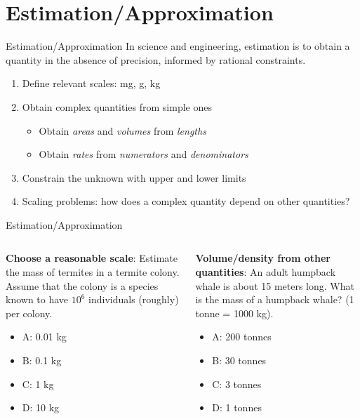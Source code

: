 \documentclass{beamer}
\begin{document}
\section{Estimation/Approximation}

\begin{frame}{Estimation/Approximation}
In science and engineering, \alert{estimation} is to obtain a quantity in the absence of precision, informed by rational constraints.
\begin{enumerate}
\item Define relevant \alert{scales}: mg, g, kg
\item Obtain \alert{complex quantities} from simple ones
\begin{itemize}
\item Obtain \textit{areas} and \textit{volumes} from \textit{lengths}
\item Obtain \textit{rates} from \textit{numerators} and \textit{denominators}
\end{itemize}
\item Constrain the unknown with \alert{upper} and \alert{lower} limits
\item Scaling problems: how does a complex quantity depend on other quantities?
\end{enumerate}
\end{frame}

\begin{frame}{Estimation/Approximation}
\small
\begin{columns}[T]
\begin{column}{0.5\textwidth}
\textbf{Choose a reasonable scale}: Estimate the mass of termites in a termite colony.  Assume that the colony is a species known to have $10^6$ individuals (roughly) per colony.
\begin{itemize}
\item A: 0.01 kg
\item B: 0.1 kg
\item C: 1 kg
\item D: 10 kg
\end{itemize}
\end{column}
\begin{column}{0.5\textwidth}
\textbf{Volume/density from other quantities}: An adult humpback whale is about 15 meters long.  What is the mass of a humpback whale? (1 tonne = 1000 kg).
\vspace{0.55cm}
\begin{itemize}
\item A: 200 tonnes
\item B: 30 tonnes
\item C: 3 tonnes
\item D: 1 tonnes
\end{itemize}
\end{column}
\end{columns}
\end{frame}
\end{document}
